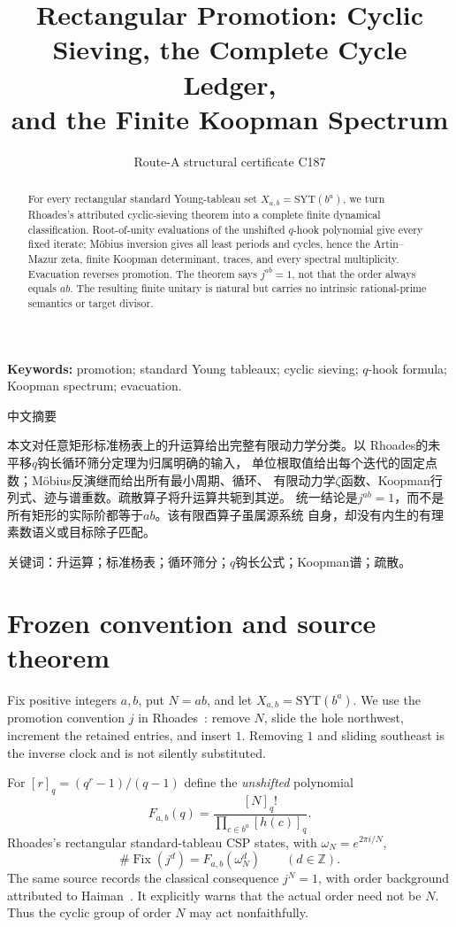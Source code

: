 \documentclass[9pt]{extarticle}
\title{Rectangular Promotion: Cyclic Sieving, the Complete Cycle Ledger,\\
and the Finite Koopman Spectrum}
\author{Route-A structural certificate C187}
\date{}
\begin{document}
\maketitle
\begin{abstract}
For every rectangular standard Young-tableau set $X_{a,b}=\mathrm{SYT}(b^a)$,
we turn Rhoades's attributed cyclic-sieving theorem into a complete finite
dynamical classification.  Root-of-unity evaluations of the unshifted
$q$-hook polynomial give every fixed iterate; M\"obius inversion gives all
least periods and cycles, hence the Artin--Mazur zeta, finite Koopman
determinant, traces, and every spectral multiplicity.  Evacuation reverses
promotion.  The theorem says $j^{ab}=1$, not that the order always equals
$ab$.  The resulting finite unitary is natural but carries no intrinsic
rational-prime semantics or target divisor.
\end{abstract}
\noindent\textbf{Keywords:} promotion; standard Young tableaux; cyclic
sieving; $q$-hook formula; Koopman spectrum; evacuation.

\begin{otherlanguage}{chinese-simplified}
\begin{center}{\large 中文摘要}\end{center}
本文对任意矩形标准杨表上的升运算给出完整有限动力学分类。以
\foreignlanguage{english}{Rhoades}的未平移$q$钩长循环筛分定理为归属明确的输入，
单位根取值给出每个迭代的固定点数；\foreignlanguage{english}{M\"obius}反演继而给出所有最小周期、循环、
有限动力学$\zeta$函数、\foreignlanguage{english}{Koopman}行列式、迹与谱重数。疏散算子将升运算共轭到其逆。
统一结论是$j^{ab}=1$，而不是所有矩形的实际阶都等于$ab$。该有限酉算子虽属源系统
自身，却没有内生的有理素数语义或目标除子匹配。

\noindent 关键词：升运算；标准杨表；循环筛分；$q$钩长公式；\foreignlanguage{english}{Koopman}谱；疏散。
\end{otherlanguage}

\section{Frozen convention and source theorem}
Fix positive integers $a,b$, put $N=ab$, and let
$X_{a,b}=\mathrm{SYT}(b^a)$.  We use the promotion convention $j$ in
Rhoades~\cite{Rhoades10}: remove $N$, slide the hole northwest, increment the
retained entries, and insert $1$.  Removing $1$ and sliding southeast is the
inverse clock and is not silently substituted.

For $[r]_q=(q^r-1)/(q-1)$ define the \emph{unshifted} polynomial
\[
 F_{a,b}(q)=\frac{[N]_q!}{\prod_{c\in b^a}[h(c)]_q}.
\]
Rhoades's rectangular standard-tableau CSP states, with
$\omega_N=e^{2\pi i/N}$,
\begin{equation}\label{eq:csp}
 \#\operatorname{Fix}(j^d)=F_{a,b}(\omega_N^d)
 \qquad(d\in\mathbb Z).
\end{equation}
The same source records the classical consequence $j^N=1$, with order
background attributed to Haiman~\cite{Haiman92}.  It explicitly warns that
the actual order need not be $N$.  Thus the cyclic group of order $N$ may act
nonfaithfully.
\end{document}
